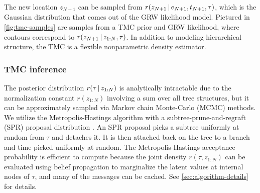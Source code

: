 The new location $z_{N + 1}$ can be sampled from  $r(z_{N + 1} \,|\, e_{N + 1}, t_{N + 1}, \tau)$, which is
the Gaussian distribution that comes out of the GRW likelihood model.
Pictured in \autoref{fig:tmc-samples} are samples from a TMC prior and GRW likelihood, where contours correspond to $r(z_{N + 1} \,|\, z_{1:N}, \tau)$.
In addition to modeling hierarchical structure, the TMC is a flexible nonparametric density estimator.

\subsubsection{TMC inference}

The posterior distribution $r(\tau \,|\, z_{1:N})$
is analytically intractable due to the normalization constant
$r(z_{1:N})$ involving a sum over all tree structures,
but it can be approximately sampled via Markov chain Monte-Carlo (MCMC) methods.
We utilize the Metropolis-Hastings
algorithm with a subtree-prune-and-regraft (SPR)
proposal distribution \citep{neal2003density}. An SPR proposal
picks a subtree uniformly at random from $\tau$
and detaches it.
It is then attached back on the tree
to a branch and time picked uniformly at random.
The Metropolis-Hastings acceptance probability is efficient to compute because the joint density $r(\tau, z_{1:N})$ can be evaluated using belief propagation to marginalize the latent values at internal nodes of $\tau$, and many of the messages can be cached.
See \autoref{sec:algorithm-details} for details.

